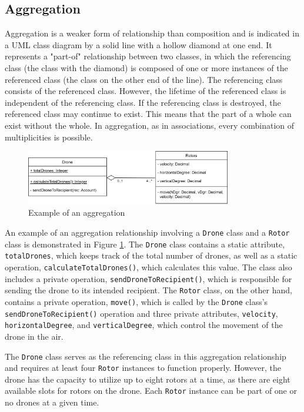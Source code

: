 \documentclass[
	12pt,
    a4paper,
    egregdoesnotlikesansseriftitles, %
    toc=chapterentrywithdots,
    oneside, openany,
    titlepage,
    parskip=half,
    headings=normal,  %
    listof=totoc,
    bibliography=totoc,
    index=totoc,
    captions=tableheading,  %
    listof=flat,
    numbers=noenddot, %
    final]
    {scrbook}
\begin{document}
\subsection{Aggregation}
Aggregation is a weaker form of relationship than composition and is indicated in a UML class diagram by a solid line with a hollow diamond at one end. 
It represents a "part-of" relationship between two classes, in which the referencing class (the class with the diamond) is composed of one or more instances of the referenced class (the class on the other end of the line).
The referencing class consists of the referenced class.
However, the lifetime of the referenced class is independent of the referencing class.
If the referencing class is destroyed, the referenced class may continue to exist.
This means that the part of a whole can exist without the whole.
In aggregation, as in associations, every combination of multiplicities is possible.


\begin{figure}[h]
	\centering
	\includegraphics[width=0.8\textwidth]{figures/aggr_comp/aggr.jpg}
	\caption[Example aggregation]{Example of an aggregation}
	\label{fig:aggregation_example} 
\end{figure}


An example of an aggregation relationship involving a \texttt{Drone} class and a \texttt{Rotor} class is demonstrated in Figure \ref{fig:aggregation_example}. 
The \texttt{Drone} class contains a static attribute, \texttt{totalDrones}, which keeps track of the total number of drones, as well as a static operation, \texttt{calculateTotalDrones()}, which calculates this value. 
The class also includes a private operation, \texttt{sendDroneToRecipient()}, which is responsible for sending the drone to its intended recipient. 
The \texttt{Rotor} class, on the other hand, contains a private operation, \texttt{move()}, which is called by the \texttt{Drone} class's \texttt{sendDroneToRecipient()} operation and three private attributes, \texttt{velocity}, \texttt{horizontalDegree}, and \texttt{verticalDegree}, which control the movement of the drone in the air. \cite[p. 153]{uml}

The \texttt{Drone} class serves as the referencing class in this aggregation relationship and requires at least four \texttt{Rotor} instances to function properly. 
However, the drone has the capacity to utilize up to eight rotors at a time, as there are eight available slots for rotors on the drone. 
Each \texttt{Rotor} instance can be part of one or no drones at a given time.
\end{document}
